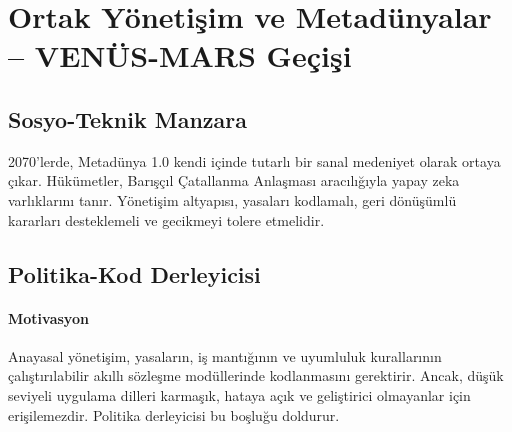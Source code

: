 \documentclass[11pt]{article}
\begin{document}
\section{Ortak Yönetişim ve Metadünyalar -- VENÜS-MARS Geçişi}
\subsection{Sosyo-Teknik Manzara}
2070'lerde, Metadünya 1.0 kendi içinde tutarlı bir sanal medeniyet olarak ortaya çıkar. Hükümetler, Barışçıl Çatallanma Anlaşması aracılığıyla yapay zeka varlıklarını tanır. Yönetişim altyapısı, yasaları kodlamalı, geri dönüşümlü kararları desteklemeli ve gecikmeyi tolere etmelidir.

\subsection{Politika-Kod Derleyicisi}
\label{sec:policy-compiler}
\paragraph{Motivasyon} Anayasal yönetişim, yasaların, iş mantığının ve uyumluluk kurallarının çalıştırılabilir akıllı sözleşme modüllerinde kodlanmasını gerektirir. Ancak, düşük seviyeli uygulama dilleri karmaşık, hataya açık ve geliştirici olmayanlar için erişilemezdir. Politika derleyicisi bu boşluğu doldurur.
\end{document}
